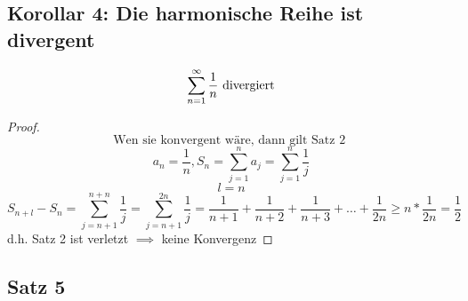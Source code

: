 \subsection{Korollar 4: Die harmonische Reihe ist divergent}

\[\sum_{n=1}^{\infty} \frac{1}{n} \text{ divergiert}\]

\begin{proof}
  
  \[\text{Wen sie konvergent wäre, dann gilt Satz 2 }\] 
  \[a_n = \frac{1}{n} , S_n = \sum_{j=1}^n a_j = \sum_{j=1}^n \frac{1}{j}\]
  \[l=n\]
  \[S_{n+l}-S_n = \sum_{j=n+1}^{n+n} \frac{1}{j} = \sum_{j=n+1}^{2n} \frac{1}{j} = \frac{1}{n+1} + \frac{1}{n+2} + \frac{1}{n+3} + \ldots + \frac{1}{2n} \geq n*\frac{1}{2n}=\frac{1}{2}\]
  d.h. Satz 2 ist verletzt $\implies$ keine Konvergenz
\end{proof}

\subsection{Satz 5}

